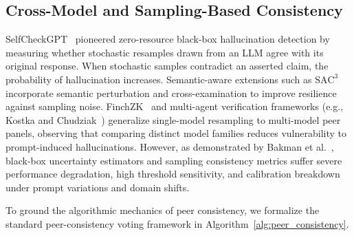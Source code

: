 \documentclass[pdflatex,sn-mathphys,Numbered]{sn-jnl}
\begin{document}
\subsection{Cross-Model and Sampling-Based Consistency}
SelfCheckGPT~\cite{manakul2023selfcheckgpt} pioneered zero-resource black-box hallucination detection by measuring whether stochastic resamples drawn from an LLM agree with its original response. When stochastic samples contradict an asserted claim, the probability of hallucination increases. Semantic-aware extensions such as $\mathrm{SAC}^3$~\cite{zhang2023sac3} incorporate semantic perturbation and cross-examination to improve resilience against sampling noise. FinchZK~\cite{goel2025finchzk} and multi-agent verification frameworks (e.g., Kostka and Chudziak~\cite{kostka2026uncertainty}) generalize single-model resampling to multi-model peer panels, observing that comparing distinct model families reduces vulnerability to prompt-induced hallucinations. However, as demonstrated by Bakman et al.~\cite{bakman2025wild}, black-box uncertainty estimators and sampling consistency metrics suffer severe performance degradation, high threshold sensitivity, and calibration breakdown under prompt variations and domain shifts.

To ground the algorithmic mechanics of peer consistency, we formalize the standard peer-consistency voting framework in Algorithm~\ref{alg:peer_consistency}.
\end{document}
